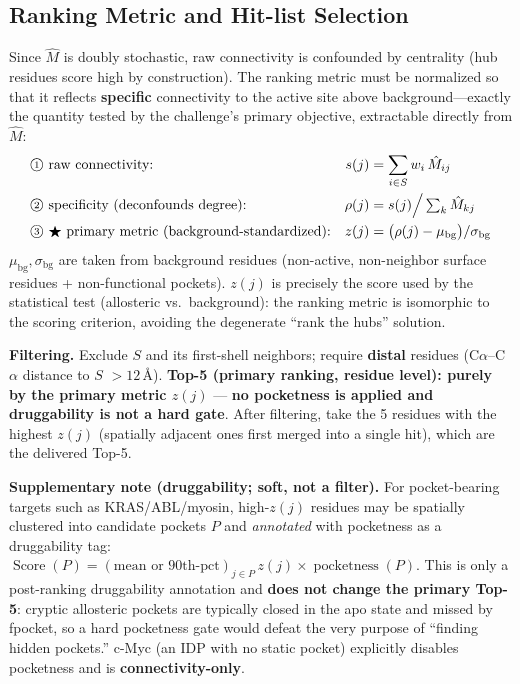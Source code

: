 \documentclass[11pt,a4paper]{article}
\newcommand{\mhat}{\hat{M}}
\newcommand{\lead}[1]{\textbf{#1}}
\newcommand{\note}[1]{{\color{grey}\small #1}}
\newcommand{\Ang}{\text{\AA}}
\newcommand{\cnum}[1]{\raisebox{0.4pt}{\textcircled{\kern-0.4pt\scriptsize #1\kern-0.4pt}}}
\newcommand{\ding}{\cnum{1}}
\newcommand{\dingtwo}{\cnum{2}}
\newcommand{\dingthree}{\cnum{3}}
\begin{document}
\subsection{Ranking Metric and Hit-list Selection}
Since $\mhat$ is doubly stochastic, raw connectivity is confounded by centrality (hub residues score high by construction). The ranking metric must be normalized so that it reflects \lead{specific} connectivity to the active site above background---exactly the quantity tested by the challenge's primary objective, extractable directly from $\mhat$:
\begin{align*}
&\text{\ding\ raw connectivity:} &s(j)&=\sum_{i\in S} w_i\,\mhat_{ij}\\
&\text{\dingtwo\ specificity (deconfounds degree):} &\rho(j)&=s(j)\Big/\textstyle\sum_k \mhat_{kj}\\
&\text{\dingthree\ $\bigstar$ primary metric (background-standardized):} &z(j)&=\big(\rho(j)-\mu_{\text{bg}}\big)/\sigma_{\text{bg}}
\end{align*}
\note{$\mu_{\text{bg}},\sigma_{\text{bg}}$ are taken from background residues (non-active, non-neighbor surface residues + non-functional pockets). $z(j)$ is precisely the score used by the statistical test (allosteric vs.\ background): the ranking metric is isomorphic to the scoring criterion, avoiding the degenerate ``rank the hubs'' solution.}

\smallskip
\lead{Filtering.} Exclude $S$ and its first-shell neighbors; require \lead{distal} residues (C$\alpha$--C$\alpha$ distance to $S$ $>12\,\Ang$). \lead{Top-5 (primary ranking, residue level): purely by the primary metric $z(j)$} --- \lead{no pocketness is applied and druggability is not a hard gate}. After filtering, take the 5 residues with the highest $z(j)$ (spatially adjacent ones first merged into a single hit), which are the delivered Top-5.

\note{\lead{Supplementary note (druggability; soft, not a filter).} For pocket-bearing targets such as KRAS/\allowbreak ABL/\allowbreak myosin, high-$z(j)$ residues may be spatially clustered into candidate pockets $P$ and \emph{annotated} with pocketness as a druggability tag: $\operatorname{Score}(P)=(\text{mean or 90th-pct})_{j\in P}\,z(j)\times\operatorname{pocketness}(P)$. This is only a post-ranking druggability annotation and \textbf{does not change the primary Top-5}: cryptic allosteric pockets are typically closed in the apo state and missed by fpocket, so a hard pocketness gate would defeat the very purpose of ``finding hidden pockets.'' c-Myc (an IDP with no static pocket) explicitly disables pocketness and is \textbf{connectivity-only}.}
\end{document}
